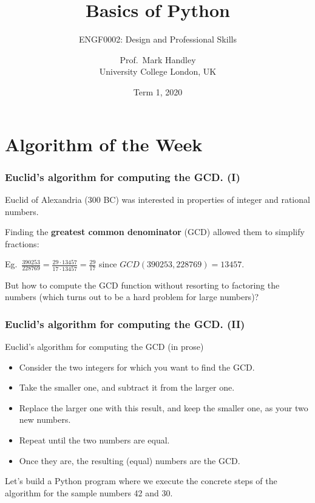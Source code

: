 \documentclass{beamer} %
\author{Prof.\ Mark Handley \\ University College London, UK}
\title{Basics of Python}
\subtitle{ENGF0002: Design and Professional Skills }
\date{Term 1, 2020}
\newcommand\emc[1]{\textcolor{midred}{\textbf{#1}}}
\begin{document}
\nobibliography*

\frame{
\titlepage
}


\section{Algorithm of the Week}


\begin{frame}
\frametitle{Euclid's algorithm for computing the GCD. (I)} 

Euclid of Alexandria (300 BC) was interested in properties of integer and rational numbers. 

\vspace{5mm}
Finding the \emc{greatest common denominator} (GCD) allowed them to simplify fractions:

\vspace{5mm}
Eg.\ $\frac{390253}{228769} = \frac{29 \cdot 13457}{17 \cdot 13457} = \frac{29}{17}$ since $GCD(390253, 228769) = 13457$.

\vspace{5mm}
But how to compute the GCD function without resorting to factoring the numbers (which turns out to be a hard problem for large numbers)?

\end{frame}

\begin{frame}
\frametitle{Euclid's algorithm for computing the GCD. (II)} 

\begin{block}{Euclid's algorithm for computing the GCD (in prose)}
\begin{itemize}
\item Consider the two integers for which you want to find the GCD.
\item Take the smaller one, and subtract it from the larger one. 
\item Replace the larger one with this result, and keep the smaller one, as your two new numbers. 
\item Repeat until the two numbers are equal. 
\item Once they are, the resulting (equal) numbers are the GCD.  
\end{itemize}
\end{block}

Let's build a Python program where we execute the concrete steps of the algorithm for the sample numbers 42 and 30.

\end{frame}
\end{document}
